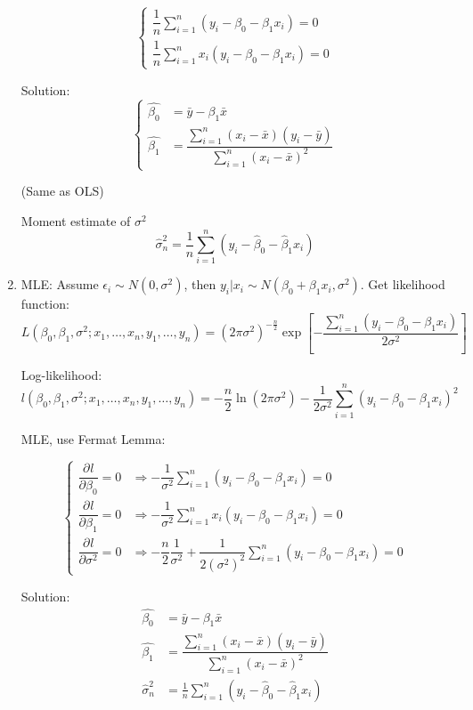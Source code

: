 \begin{enumerate}
\[\begin{cases}
            \dfrac{1}{n}\sum_{i=1}^n(y_i-\beta_0-\beta_1x_i)=0\\
            \dfrac{1}{n}\sum_{i=1}^nx_i(y_i-\beta_0-\beta_1x_i)=0
        \end{cases}\]

        Solution:
        \[\begin{cases}
            \hat{\beta_0}&=\bar{y}-\beta_1\bar{x}\\
            \hat{\beta_1}&=\dfrac{\sum_{i=1}^n(x_i-\bar{x})(y_i-\bar{y})}{\sum_{i=1}^n(x_i-\bar{x})^2}
        \end{cases}\]

        (Same as OLS)

        Moment estimate of $\sigma^2$
        \[\hat{\sigma}^2_n=\frac{1}{n}\sum_{i=1}^n(y_i-\hat{\beta}_0-\hat{\beta}_1x_i)\]

    \item MLE: Assume $\epsilon_i\sim N(0,\sigma^2)$, then $y_i|x_i\sim N(\beta_0+\beta_1x_i,\sigma^2)$. Get likelihood function:
        \[
            L(\beta_0,\beta_1,\sigma^2;x_1,\ldots,x_n,y_1,\ldots,y_n)=(2\pi\sigma^2)^{-\frac{n}{2}}\exp\left[-\frac{\sum_{i=1}^n(y_i-\beta_0-\beta_1x_i)}{2\sigma^2}\right]  
        \]

    Log-likelihood:
    \[
        l(\beta _0,\beta _1,\sigma ^2;x_1,\ldots,x_n,y_1,\ldots,y_n)=-\dfrac{n}{2} \ln(2\pi\sigma ^2)-\dfrac{1}{2\sigma ^2}\sum_{i=1}^n(y_i-\beta _0-\beta _1x_i)^2
    \]

    MLE, use Fermat Lemma:

\[
    \begin{cases}
        \dfrac{\partial^{} l}{\partial \beta _0^{}}=0&\Rightarrow -\dfrac{1}{\sigma ^2}{\displaystyle\sum_{i=1}^n(y_i-\beta _0-\beta _1x_i)}=0\\
        \dfrac{\partial^{} l}{\partial \beta _1^{}}=0&\Rightarrow -\dfrac{1}{\sigma ^2}{\displaystyle\sum_{i=1}^nx_i(y_i-\beta _0-\beta _1x_i)}=0\\
        \dfrac{\partial^{} l}{\partial \sigma^2}=0&\Rightarrow -\dfrac{n}{2}\dfrac{1}{\sigma ^2}+\dfrac{1}{2(\sigma ^2)^2} {\displaystyle\sum_{i=1}^n(y_i-\beta _0-\beta _1x_i)}=0
    \end{cases} 
\]

    Solution:
    \begin{align*}
        \hat{\beta_0}&=\bar{y}-\beta_1\bar{x}\\
        \hat{\beta_1}&=\dfrac{\sum_{i=1}^n(x_i-\bar{x})(y_i-\bar{y})}{\sum_{i=1}^n(x_i-\bar{x})^2}\\
        \hat{\sigma}^2_n&=\frac{1}{n}\sum_{i=1}^n(y_i-\hat{\beta}_0-\hat{\beta}_1x_i)
    \end{align*}
    
    
    \end{enumerate}

